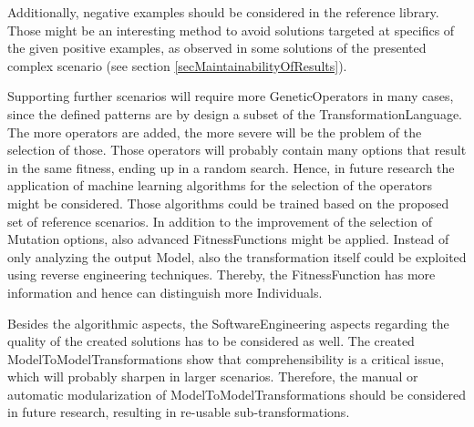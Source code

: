 Additionally, negative examples should be considered in the reference library. Those might be an interesting method to avoid solutions targeted at specifics of the given positive examples, as observed in some solutions of the presented complex scenario (see section \ref{secMaintainabilityOfResults}).

Supporting further scenarios will require more \glspl{GeneticOperator} in many cases, since the defined patterns are by design a subset of the \gls{TransformationLanguage}. The more operators are added, the more severe will be the problem of the selection of those. Those operators will probably contain many options that result in the same fitness, ending up in a random search. Hence, in future research the application of machine learning algorithms for the selection of the operators might be considered. Those algorithms could be trained based on the proposed set of reference scenarios. In addition to the improvement of the selection of \gls{Mutation} options, also advanced \glspl{FitnessFunction} might be applied. Instead of only analyzing the output \gls{Model}, also the transformation itself could be exploited using reverse engineering techniques. Thereby, the \gls{FitnessFunction} has more information and hence can distinguish more \glspl{Individual}.

Besides the algorithmic aspects, the \gls{SoftwareEngineering} aspects regarding the quality of the created solutions has to be considered as well. The created \glspl{ModelToModelTransformation} show that comprehensibility is a critical issue, which will probably sharpen in larger scenarios. Therefore, the manual or automatic modularization of \glspl{ModelToModelTransformation} should be considered in future research, resulting in re-usable sub-transformations. %


